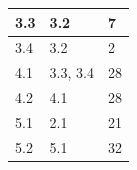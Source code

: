 \begin{table}[H]
\begin{tabular}{|p{4cm}|p{5.83cm}|p{4cm}|}
\hline
{\cellcolor[rgb]{0.851,0.886,0.953}}3.3                               & 3.2                                     & 7                                            \\ 
\hline
{\cellcolor[rgb]{0.851,0.886,0.953}}3.4                               & 3.2                                     & 2                                            \\ 
\hline
{\cellcolor[rgb]{0.851,0.886,0.953}}4.1                               & 3.3, 3.4                                & 28                                           \\ 
\hline
{\cellcolor[rgb]{0.851,0.886,0.953}}4.2                               & 4.1                                     & 28                                           \\ 
\hline
{\cellcolor[rgb]{0.851,0.886,0.953}}5.1                               & 2.1                                     & 21                                           \\ 
\hline
{\cellcolor[rgb]{0.851,0.886,0.953}}5.2                               & 5.1                                     & 32                                           \\
\hline
\end{tabular}
\end{table}

